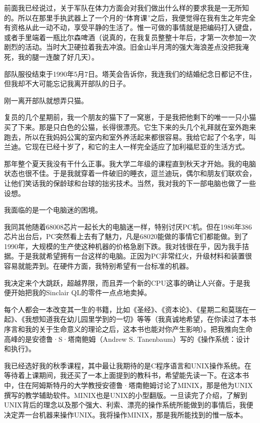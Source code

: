 前面我已经说过，关于军队在体力方面会对我们做出什么样的要求我是一无所知的。所以在那里手执武器上了一个月的“体育课”之后，我便觉得在我有生之年完全有资格从此一动不动，享受平静的生活了。惟一可做的事情就是把编码打入键盘，或者手里端着一瓶比尔森啤酒（说真的，在我复员整整十年后，才第一次参加一次剧烈的活动。当时大卫硬拉着我去冲浪。旧金山半月湾的强大海浪差点没把我淹死，我的腿一连酸了好几天）。

部队服役结束于1990年5月7日。塔芙会告诉你，我连我们的结婚纪念日都记不住，但我却不大可能忘记我离开部队的日子。

刚一离开部队就想弄只猫。

复员的几个星期前，我一个朋友的猫下了一窝崽，于是我把他剩下的唯一一只小猫买了下来。那是只白色的公猫，长得很漂亮。它生下来的头几个礼拜就在室外跑来跑去，所以在我妈妈公寓的室内和室外养活起来都很容易。我给它起了个名字，叫兰迪。它现在已经十岁了，和它的主人一样完全适应了加利福尼亚的生活方式。

那年整个夏天我没有干什么正事。我大学二年级的课程直到秋天才开始。我的电脑状态也很不佳。于是我就穿着一件破旧的睡衣，逗兰迪玩，偶尔和朋友们联欢会，让他们笑话我的保龄球和台球的拙劣技术。当然，我对我的下一部电脑也做了一些设想。

我面临的是一个电脑迷的困境。

我同其他随着68008芯片一起长大的电脑迷一样，特别讨厌PC机。但在1986年386芯片出台后，PC突然看上去有了魅力，凡是68020能做的事情它们都能做。到了1990年，大规模的生产使这种机器的价格急剧下跌。我对钱很在乎，因为我手拮据。于是我就希望拥有一台这样的电脑。正因为PC非常红火，升级材料和装置很容易就能弄到。在硬件方面，我特别希望有一台标准的机器。

我决定来个大跳跃，超越界限，而且弄一个新的CPU这事的确让人兴奋。于是我便开始把我的Sinclair QL的零件一点点地卖掉。

每个人都会一本改变其一生的书籍，比如《圣经》、《资本论》、《星期二和莫瑞在一起》、《我想知道我在幼儿园里学到的一切》等等（我真诚地希望，在你读过了本书序言和我的关于生命意义的理论之后，这本书也能对你产生影响）。把我推向生命高峰的是安德鲁·S·塔南鲍姆（Andrew S. Tanenbaum）写的《操作系统：设计和执行》。

我已经选好我的秋季课程，其中最让我期待的是C程序语言和UNIX操作系统。在等待着上课期间，我还买了一本上面提到的教科书，希望能先读一下。在这本书中，住在阿姆斯特丹的大学教授安德鲁·塔南鲍姆讨论了MINIX，那是他为UNIX撰写的教学辅助软件。MINIX也是UNIX的小型翻版。一旦读完了介绍，了解到UNIX背后的理念以及那个强大、利索、漂亮的操作系统所能做到的事情后，我便决定弄一台机器来操作UNIX。我将操作MINIX，那是我所能找到的惟一版本。


